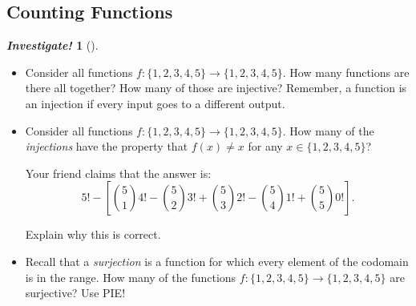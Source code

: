 \documentclass[10pt,]{book}
\theoremstyle{plain}
\theoremstyle{definition}
\theoremstyle{definition}
\newtheorem{investigation}[project]{\emph{Investigate!}}
\theoremstyle{definition}
\numberwithin{equation}{chapter}
\begin{document}
\subsection[Counting Functions]{Counting Functions}\label{subsection-20}
\begin{investigation}[]\label{investigation-13}

    \leavevmode%
\begin{itemize}[label=\textbullet]
\item{}
    Consider all functions \(f: \{1,2,3,4,5\} \to \{1,2,3,4,5\}\). How many functions are there all together? How many of those are injective? Remember, a function is an injection if every input goes to a different output.
\item{}
    Consider all functions \(f: \{1,2,3,4,5\} \to \{1,2,3,4,5\}\). How many of the \emph{injections} have the property that \(f(x) \ne x\) for any \(x \in \{1,2,3,4,5\}\)?
\par

    Your friend claims that the answer is:
    \begin{equation*}
      5! - \left[ {5\choose 1}4! - {5 \choose 2}3! + {5\choose 3}2! - {5 \choose 4}1! + {5\choose 5}0! \right].
    \end{equation*}
\par

    Explain why this is correct.
\item{}
    Recall that a \emph{surjection} is a function for which every element of the codomain is in the range. How many of the functions \(f: \{1,2,3,4,5\} \to \{1,2,3,4,5\}\) are surjective? Use PIE!
\end{itemize}

\end{investigation}
\end{document}

